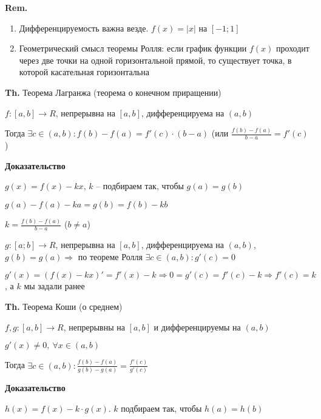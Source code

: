 \documentclass[14pt, letter paper]{article}
\begin{document}
\vspace{5mm}

\textbf{Rem.} \begin{enumerate}
    \item Дифференцируемость важна везде. $f(x) = |x|$ на $[-1; 1]$
    \item Геометрический смысл теоремы Ролля: если график функции $f(x)$ проходит через две точки на одной горизонтальной прямой, то существует точка, в которой касательная горизонтальна
\end{enumerate}

\vspace{5mm}

\textbf{Th.} Теорема Лагранжа (теорема о конечном приращении)

$f : [a, b] \rightarrow R$, непрерывна на $[a, b]$, дифференцируема на $(a, b)$

Тогда $\exists c \in (a, b) : f(b) - f(a) = f'(c) \cdot (b - a)$ (или $\frac{f(b) - f(a)}{b - a} = f'(c)$)

\begin{center}
    \textbf{Доказательство}
\end{center}

$g(x) = f(x) - kx$, $k$ -- подбираем так, чтобы $g(a) = g(b)$

$g(a) - f(a) - ka = g(b) = f(b) - kb$

$k = \frac{f(b) - f(a)}{b - a}$ ($b \neq a$)

$g : [a; b] \rightarrow R$, непрерывна на $[a,b]$, дифференцируема на $(a, b)$, $g(b) = g(a) \Rightarrow$ по теореме Ролля $\exists c \in (a, b) : g'(c) = 0$

$g'(x) = (f(x) - kx)' = f'(x) - k \Rightarrow 0 = g'(c) = f'(c) - k \Rightarrow f'(c) = k$, а $k$ мы задали ранее

\vspace{5mm}

\textbf{Th.} Теорема Коши (о среднем)

$f, g : [a, b] \rightarrow R$, непрерывны на $[a, b]$ и дифференцируемы на $(a, b)$

$g'(x) \neq 0,\ \forall x \in (a, b)$

Тогда $\exists c \in (a, b) : \frac{f(b) - f(a)}{g(b) - g(a)} = \frac{f'(c)}{g'(c)}$

\begin{center}
    \textbf{Доказательство}
\end{center}

$h(x) = f(x) - k \cdot g(x)$. $k$ подбираем так, чтобы $h(a) = h(b)$
\end{document}
